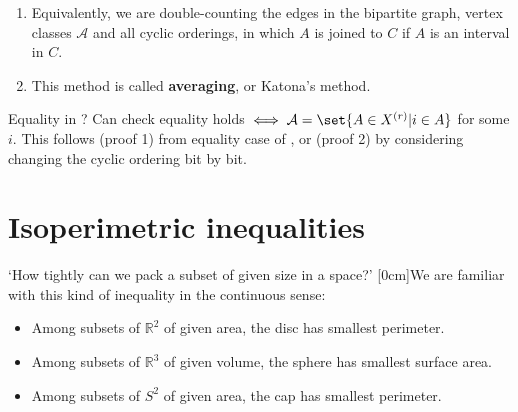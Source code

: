 \documentclass{article}
\newcommand{\A}{\mathcal{A}}
\newcommand{\named}[1]{\textbf{#1}\index{#1}}
\begin{document}
\begin{remark}\leavevmode
  \begin{enumerate}
    \item Equivalently, we are double-counting the edges in the bipartite graph, vertex classes $\A$ and all cyclic orderings, in which $A$ is joined to $C$ if $A$ is an interval in $C$.
    \item This method is called \named{averaging}, or Katona's method.
  \end{enumerate}
\end{remark}
Equality in ? Can check equality holds $\iff \A = \set{A \in X^{(r)} | i \in A}$ for some $i$.
This follows (proof 1) from equality case of , or (proof 2) by considering changing the cyclic ordering bit by bit.
\clearpage
\section{Isoperimetric inequalities}
`How tightly can we pack a subset of given size in a space?'
[0cm]We are familiar with this kind of inequality in the continuous sense:
\begin{itemize}
  \item Among subsets of $\mathbb{R}^2$ of given area, the disc has smallest perimeter.
  \item Among subsets of $\mathbb{R}^3$ of given volume, the sphere has smallest surface area.
  \item Among subsets of $S^2$ of given area, the cap has smallest perimeter.
\end{itemize}

\begin{center}
\end{center}
\end{document}
